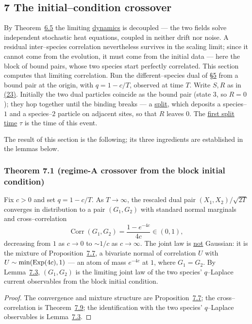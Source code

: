 \documentclass[11pt]{article}
\theoremstyle{plain}
\theoremstyle{definition}
\theoremstyle{remark}
\DeclareMathOperator{\Corr}{Corr}\DeclareMathOperator{\cum}{cum}
\begin{document}
\subsection{7 The initial--condition crossover}\label{sec_cross}

By Theorem~\hyperref[thm_ewmain]{6.5} the limiting \underline{dynamics} is decoupled --- the two fields
solve independent stochastic heat equations, coupled in neither drift nor noise. A
residual inter--species correlation nevertheless survives in the scaling limit; since it
cannot come from the evolution, it must come from the initial data --- here the block of
bound pairs, whose two species start perfectly correlated. This section computes that
limiting correlation. Run the different--species dual of \S\hyperref[sec_kernel]{5} from a bound pair at
the origin, with $q=1-c/T$, observed at time $T$. Write $S,R$ as in \hyperref[eq_SR]{(23)}.
Initially the two dual particles coincide as the bound pair (state $3$, so $R=0$); they
hop together until the binding breaks --- a \underline{split}, which deposits a species--$1$
and a species--$2$ particle on adjacent sites, so that $R$ leaves $0$. The \underline{first
split time} $\tau$ is the time of this event.

The result of this section is the following; its three ingredients are established in the
lemmas below.

\subsubsection{Theorem 7.1 (regime-A crossover from the block initial condition)}\label{thm_cross}

Fix $c>0$ and set $q=1-c/T$. As $T\to\infty$, the rescaled dual pair $(X_1,X_2)/\sqrt{2T}$
converges in distribution to a pair $(G_1,G_2)$ with standard normal marginals and
cross--correlation
\[
  \Corr(G_1,G_2)=\frac{1-e^{-4c}}{4c}\in(0,1),
\]
decreasing from $1$ as $c\to0$ to $\sim1/c$ as $c\to\infty$. The joint law is \underline{not}
Gaussian: it is the mixture of Proposition~\hyperref[prop_twophase]{7.7}, a bivariate normal of
correlation $U$ with $U\sim\min(\mathrm{Exp}(4c),1)$ --- an atom of mass $e^{-4c}$ at $1$, where
$G_1=G_2$. By Lemma~\hyperref[lem_crossbridge]{7.3}, $(G_1,G_2)$ is the limiting joint law of the
two species' $q$--Laplace current observables from the block initial condition.
\par
\begin{proof}
The convergence and mixture structure are Proposition~\hyperref[prop_twophase]{7.7}; the
cross--correlation is Theorem~\hyperref[thm_closed]{7.9}; the identification with the two species'
$q$--Laplace observables is Lemma~\hyperref[lem_crossbridge]{7.3}.
\end{proof}
\end{document}
